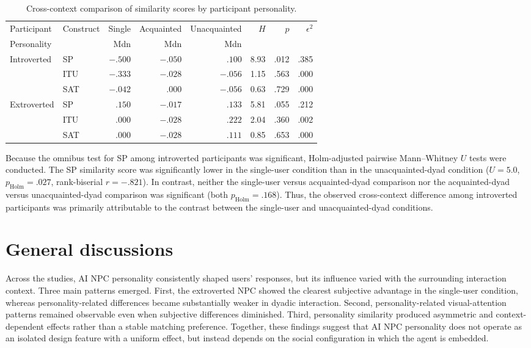 \documentclass[a4paper,fleqn]{cas-sc}
\begin{document}
\begin{table}[t]
\centering
\caption{Cross-context comparison of similarity scores by participant personality.}
\label{tab:cross_similarity_personality}
\begin{tabular}{llrrrrrr}
\toprule
Participant & Construct & Single & Acquainted & Unacquainted & $H$ & $p$ & $\epsilon^2$ \\
Personality & & Mdn & Mdn & Mdn & & & \\
\midrule
Introverted
    & SP  & $-.500$ & $-.050$ & $.100$  & 8.93 & .012 & .385 \\
    & ITU & $-.333$ & $-.028$ & $-.056$ & 1.15 & .563 & .000 \\
    & SAT & $-.042$ & $.000$  & $-.056$ & 0.63 & .729 & .000 \\
\midrule
Extroverted
    & SP  & $.150$ & $-.017$ & $.133$ & 5.81 & .055 & .212 \\
    & ITU & $.000$ & $-.028$ & $.222$ & 2.04 & .360 & .002 \\
    & SAT & $.000$ & $-.028$ & $.111$ & 0.85 & .653 & .000 \\
\bottomrule
\end{tabular}
\end{table}

Because the omnibus test for SP among introverted participants was significant, Holm-adjusted pairwise Mann--Whitney $U$ tests were conducted. The SP similarity score was significantly lower in the single-user condition than in the unacquainted-dyad condition ($U=5.0$, $p_{\mathrm{Holm}}=.027$, rank-biserial $r=-.821$). In contrast, neither the single-user versus acquainted-dyad comparison nor the acquainted-dyad versus unacquainted-dyad comparison was significant (both $p_{\mathrm{Holm}}=.168$). Thus, the observed cross-context difference among introverted participants was primarily attributable to the contrast between the single-user and unacquainted-dyad conditions.

\section{General discussions}\label{sec:general}

Across the studies, AI NPC personality consistently shaped users' responses, but its influence varied with the surrounding interaction context. Three main patterns emerged. First, the extroverted NPC showed the clearest subjective advantage in the single-user condition, whereas personality-related differences became substantially weaker in dyadic interaction. Second, personality-related visual-attention patterns remained observable even when subjective differences diminished. Third, personality similarity produced asymmetric and context-dependent effects rather than a stable matching preference. Together, these findings suggest that AI NPC personality does not operate as an isolated design feature with a uniform effect, but instead depends on the social configuration in which the agent is embedded.
\end{document}
